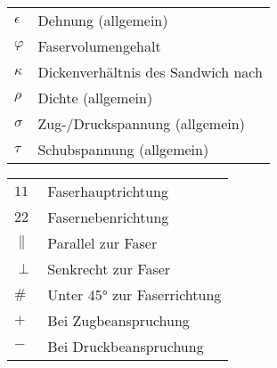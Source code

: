 \begin{table}[h]
	\begin{tabular}{ll}
		$ \epsilon $&Dehnung (allgemein)\\
		$ \varphi $&Faservolumengehalt\\
		$ \kappa $&Dickenverhältnis des Sandwich nach \cite{item1}\\
		$ \rho $&Dichte (allgemein)\\
		$ \sigma $&Zug-/Druckspannung (allgemein)\\
		$ \tau $&Schubspannung (allgemein)\\
	\end{tabular}
\end{table}

\begin{table}[h]
	\begin{tabular}{ll}
		$ 11 $&Faserhauptrichtung\\
		$ 22 $&Fasernebenrichtung\\
		$ \parallel $&Parallel zur Faser\\
		$ \perp $&Senkrecht zur Faser\\
		$ \# $&Unter 45° zur Faserrichtung\\
		$ + $&Bei Zugbeanspruchung\\
		$ - $&Bei Druckbeanspruchung
	\end{tabular}
\end{table}

